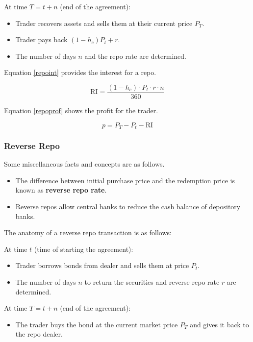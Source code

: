 \documentclass[10pt,letterpaper]{article}
\begin{document}
At time $T = t + n$ (end of the agreement):
\begin{itemize}
\item Trader recovers assets and sells them at their current price $P_T$.
\item Trader pays back $(1 - h_c) P_t + r$.
\item The number of days $n$ and the repo rate are determined.
\end{itemize}

Equation \eqref{repoint} provides the interest for a repo.

\begin{equation}\label{repoint}
\mbox{RI} = \frac{(1 -h_c) \cdot P_t \cdot r\cdot n}{360}
\end{equation}

Equation \eqref{repoprof} shows the profit for the trader.

\begin{equation}\label{repoprof}
p = P_T - P_t - \mbox{RI}
\end{equation}


\subsubsection{Reverse Repo}

Some miscellaneous facts and concepts are as follows.

\begin{itemize}

\item The difference between initial purchase price and the redemption price is known as \textbf{reverse repo rate}.

\item Reverse repos allow central banks to reduce the cash balance of depository banks.

\end{itemize}

The anatomy of a reverse repo transaction is as follows:

At time $t$ (time of starting the agreement):

\begin{itemize}
\item Trader borrows bonds from dealer and sells them at price $P_t$.
\item The number of days $n$ to return the securities and reverse repo rate $r$ are determined.
\end{itemize}

At time $T = t + n$ (end of the agreement):
\begin{itemize}
\item The trader buys the bond at the current market price $P_T$ and gives it back to the repo dealer.
\end{itemize}
\end{document}
